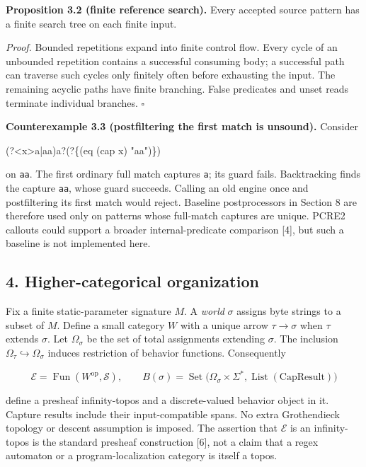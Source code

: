 \documentclass[
  11pt,
]{article}
\newenvironment{Shaded}{}{}
\newcommand{\NormalTok}[1]{#1}
\begin{document}
\textbf{Proposition 3.2 (finite reference search).} Every accepted
source pattern has a finite search tree on each finite input.

\emph{Proof.} Bounded repetitions expand into finite control flow. Every
cycle of an unbounded repetition contains a successful consuming body; a
successful path can traverse such cycles only finitely often before
exhausting the input. The remaining acyclic paths have finite branching.
False predicates and unset reads terminate individual branches.
\(\square\)

\textbf{Counterexample 3.3 (postfiltering the first match is unsound).}
Consider

\begin{Shaded}
\begin{Highlighting}[]
\NormalTok{(?\textless{}x\textgreater{}a|aa)a?(?\{(eq (cap x) "aa")\})}
\end{Highlighting}
\end{Shaded}

on \texttt{aa}. The first ordinary full match captures \texttt{a}; its
guard fails. Backtracking finds the capture \texttt{aa}, whose guard
succeeds. Calling an old engine once and postfiltering its first match
would reject. Baseline postprocessors in Section 8 are therefore used
only on patterns whose full-match captures are unique. PCRE2 callouts
could support a broader internal-predicate comparison {[}4{]}, but such
a baseline is not implemented here.

\hypertarget{higher-categorical-organization}{%
\subsection{4. Higher-categorical
organization}\label{higher-categorical-organization}}

Fix a finite static-parameter signature \(M\). A \emph{world} \(\sigma\)
assigns byte strings to a subset of \(M\). Define a small category \(W\)
with a unique arrow \(\tau\to\sigma\) when \(\tau\) extends \(\sigma\).
Let \(\Omega_\sigma\) be the set of total assignments extending
\(\sigma\). The inclusion \(\Omega_\tau\hookrightarrow\Omega_\sigma\)
induces restriction of behavior functions. Consequently

\[
\mathcal E=\operatorname{Fun}(W^{\mathrm{op}},\mathcal S),\qquad
B(\sigma)=\operatorname{Set}\bigl(\Omega_\sigma\times\Sigma^*,
\operatorname{List}(\mathrm{CapResult})\bigr)
\]

define a presheaf infinity-topos and a discrete-valued behavior object
in it. Capture results include their input-compatible spans. No extra
Grothendieck topology or descent assumption is imposed. The assertion
that \(\mathcal E\) is an infinity-topos is the standard presheaf
construction {[}6{]}, not a claim that a regex automaton or a
program-localization category is itself a topos.
\end{document}
